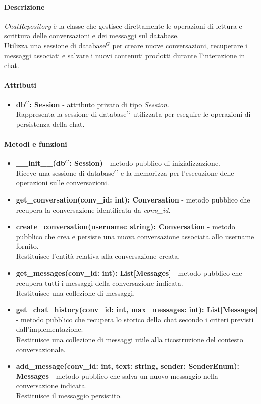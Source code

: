 \paragraph{Descrizione}
\textit{ChatRepository} \`e la classe che gestisce direttamente le operazioni di lettura e scrittura delle conversazioni e dei messaggi sul database.\\
Utilizza una sessione di database$^G$ per creare nuove conversazioni, recuperare i messaggi associati e salvare i nuovi contenuti prodotti durante l'interazione in chat.

\paragraph{Attributi}
\begin{itemize}
	\item \textbf{db$^G$: Session} - attributo privato di tipo \textit{Session}.\\
	Rappresenta la sessione di database$^G$ utilizzata per eseguire le operazioni di persistenza della chat.
\end{itemize}

\paragraph{Metodi e funzioni}
\begin{itemize}
	\item \textbf{\_\_init\_\_(db$^G$: Session)} - metodo pubblico di inizializzazione.\\
	Riceve una sessione di database$^G$ e la memorizza per l'esecuzione delle operazioni sulle conversazioni.
	\item \textbf{get\_conversation(conv\_id: int): Conversation} - metodo pubblico che recupera la conversazione identificata da \textit{conv\_id}.\\
	\item \textbf{create\_conversation(username: string): Conversation} - metodo pubblico che crea e persiste una nuova conversazione associata allo username fornito.\\
	Restituisce l'entit\`a relativa alla conversazione creata.
	\item \textbf{get\_messages(conv\_id: int): List[Messages]} - metodo pubblico che recupera tutti i messaggi della conversazione indicata.\\
	Restituisce una collezione di messaggi.
	\item \textbf{get\_chat\_history(conv\_id: int, max\_messages: int): List[Messages]} - metodo pubblico che recupera lo storico della chat secondo i criteri previsti dall'implementazione.\\
	Restituisce una collezione di messaggi utile alla ricostruzione del contesto conversazionale.
	\item \textbf{add\_message(conv\_id: int, text: string, sender: SenderEnum): Messages} - metodo pubblico che salva un nuovo messaggio nella conversazione indicata.\\
	Restituisce il messaggio persistito.
\end{itemize}
